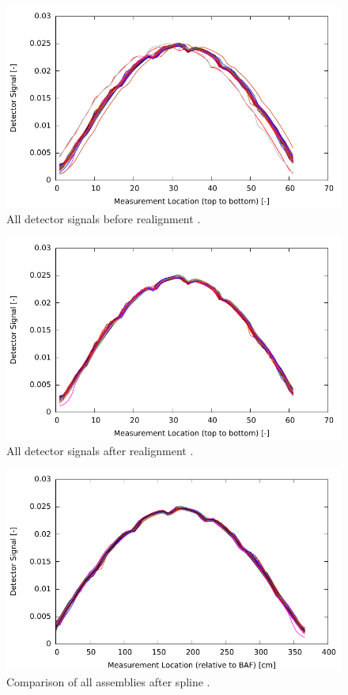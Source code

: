 \documentclass{article}
\begin{document}
\begin{figure}[!htb]
    \centering
    \includegraphics[width=4.5in]{figures/before_realign.pdf}
    \caption{All detector signals before realignment \cite{beavrs}.  \label{fig:beforerealign}}
\end{figure}

\begin{figure}[!htb]
    \centering
    \includegraphics[width=4.5in]{figures/after_realign.pdf}
    \caption{All detector signals after realignment \cite{beavrs}. \label{fig:afterrealign}}
\end{figure}

\begin{figure}[!htb]
    \centering
    \includegraphics[width=4.5in]{figures/spline_all.pdf}
    \caption{Comparison of all assemblies after spline \cite{beavrs}. \label{fig:splineall}}
\end{figure}
\end{document}
